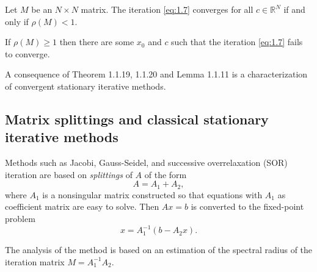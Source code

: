 \begin{thm}
  Let $M$ be an $N\times N$ matrix. The iteration \eqref{eq:1.7}
  converges for all $c\in\mathbb{R}^N$ if and only if $\rho(M)<1.$
\end{thm}

\begin{thm}
  If $\rho(M)\geq 1$ then there are some $x_0$ and $c$ such that the
  iteration \eqref{eq:1.7} fails to converge.
\end{thm}

\begin{rmk}
  A consequence of Theorem 1.1.19, 1.1.20 and Lemma 1.1.11 is a
  characterization of convergent stationary iterative methods.
\end{rmk}


\subsection{Matrix splittings and classical stationary iterative
  methods}
\label{sec:1.4}

\begin{defi}
  Methods such as Jacobi, Gauss-Seidel, and successive overrelaxation
  (SOR) iteration are based on \emph{splittings} of $A$ of the
  form $$A=A_1+A_2,$$
  where $A_1$ is a nonsingular matrix constructed so that equations
  with $A_1$ as coefficient matrix are easy to solve. Then $Ax=b$ is
  converted to the fixed-point problem $$x=A_1^{-1}(b-A_2x).$$
\end{defi}

\begin{rmk}
  The analysis of the method is based on an estimation of the spectral
  radius of the iteration matrix $M=A_1^{-1}A_2.$
\end{rmk}

